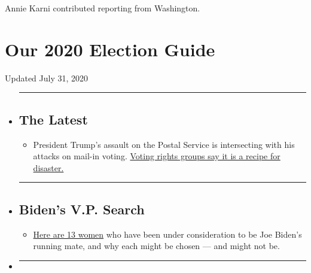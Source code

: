Annie Karni contributed reporting from Washington.

\hypertarget{our-2020-election-guide}{%
\section{Our 2020 Election Guide}\label{our-2020-election-guide}}

Updated July 31, 2020

\begin{itemize}
\item
  \begin{center}\rule{0.5\linewidth}{\linethickness}\end{center}

  \hypertarget{the-latest}{%
  \subsection{The Latest}\label{the-latest}}

  \begin{itemize}
  \tightlist
  \item
    President Trump's assault on the Postal Service is intersecting with
    his attacks on mail-in voting.
    \href{https://www.nytimes.com/2020/07/31/us/politics/trump-usps-mail-delays.html?action=click\&pgtype=Article\&state=default\&region=BELOW_MAIN_CONTENT\&context=storylines_guide}{Voting
    rights groups say it is a recipe for disaster.}
  \end{itemize}
\item
  \begin{center}\rule{0.5\linewidth}{\linethickness}\end{center}

  \hypertarget{bidens-vp-search}{%
  \subsection{Biden's V.P. Search}\label{bidens-vp-search}}

  \begin{itemize}
  \tightlist
  \item
    \href{https://www.nytimes.com/article/biden-vice-president-2020.html?action=click\&pgtype=Article\&state=default\&region=BELOW_MAIN_CONTENT\&context=storylines_guide}{Here
    are 13 women} who have been under consideration to be Joe Biden's
    running mate, and why each might be chosen --- and might not be.
  \end{itemize}
\item
  \begin{center}\rule{0.5\linewidth}{\linethickness}\end{center}


\end{itemize}
